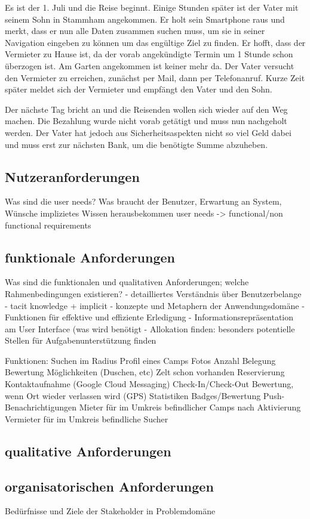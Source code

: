 Es ist der 1. Juli und die Reise beginnt. Einige Stunden später ist der Vater mit seinem Sohn in Stammham angekommen. Er holt sein Smartphone raus und merkt, dass er nun alle Daten zusammen suchen muss, um sie in seiner Navigation eingeben zu können um das engültige Ziel zu finden. Er hofft, dass der Vermieter zu Hause ist, da der vorab angekündigte Termin um 1 Stunde schon überzogen ist. Am Garten angekommen ist keiner mehr da. Der Vater versucht den Vermieter zu erreichen, zunächst per Mail, dann per Telefonanruf. Kurze Zeit später meldet sich der Vermieter und empfängt den Vater und den Sohn.

Der nächste Tag bricht an und die Reisenden wollen sich wieder auf den Weg machen. Die Bezahlung wurde nicht vorab getätigt und muss nun nachgeholt werden. Der Vater hat jedoch aus Sicherheitsaspekten nicht so viel Geld dabei und muss erst zur nächsten Bank, um die benötigte Summe abzuheben.

\subsection{Nutzeranforderungen}
Was sind die user needs?
        	Was braucht der Benutzer, Erwartung an System, Wünsche
        	implizietes Wissen herausbekommen
        	user needs -> functional/non functional requirements

\subsection{funktionale Anforderungen}        	
Was sind die funktionalen und qualitativen Anforderungen; welche Rahmenbedingungen existieren?
- detailliertes Verständnis über Benutzerbelange
- tacit knowledge + implicit
- konzepte und Metaphern der Anwendungsdomäne
- Funktionen für effektive und effiziente Erledigung
- Informationsrepräsentation am User Interface (was wird benötigt
- Allokation finden: besonders potentielle Stellen für Aufgabenunterstützung finden

Funktionen:
Suchen im Radius
Profil eines Camps
Fotos
Anzahl
Belegung
Bewertung
Möglichkeiten (Duschen, etc)
Zelt schon vorhanden
Reservierung
Kontaktaufnahme (Google Cloud Messaging)
Check-In/Check-Out
Bewertung, wenn Ort wieder verlassen wird (GPS)
Statistiken
Badges/Bewertung
Push-Benachrichtigungen
Mieter
für im Umkreis befindlicher Camps nach Aktivierung
Vermieter
für im Umkreis befindliche Sucher



\subsection{qualitative Anforderungen}   

\subsection{organisatorischen Anforderungen}        	
 
Bedürfnisse und Ziele der Stakeholder in Problemdomäne
 
